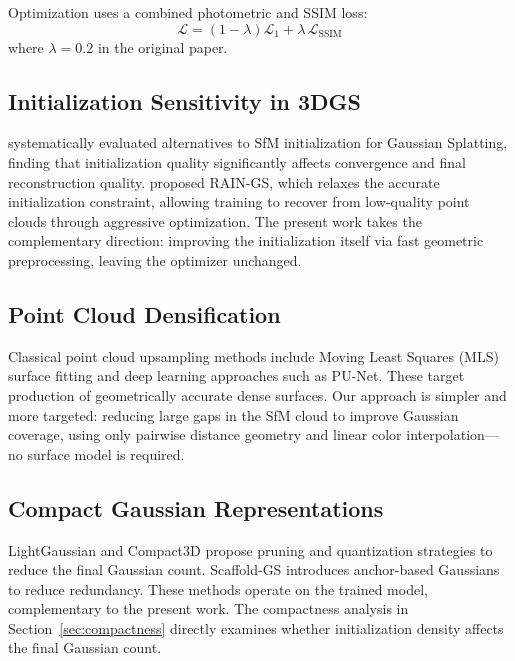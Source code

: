 \documentclass[12pt, a4paper]{article}
\begin{document}
Optimization uses a combined photometric and SSIM loss:
\begin{equation}
    \mathcal{L} = (1 - \lambda)\mathcal{L}_1 + \lambda\,\mathcal{L}_\text{SSIM}
    \label{eq:loss}
\end{equation}
where $\lambda = 0.2$ in the original paper.

\subsection{Initialization Sensitivity in 3DGS}

\citet{foroutan2024sfm} systematically evaluated alternatives to SfM initialization
for Gaussian Splatting, finding that initialization quality significantly affects
convergence and final reconstruction quality. \citet{jung2024rain} proposed RAIN-GS,
which relaxes the accurate initialization constraint, allowing training to recover
from low-quality point clouds through aggressive optimization. The present work
takes the complementary direction: improving the initialization itself via fast
geometric preprocessing, leaving the optimizer unchanged.

\subsection{Point Cloud Densification}

Classical point cloud upsampling methods include Moving Least Squares (MLS)
surface fitting and deep learning approaches such as PU-Net. These target
production of geometrically accurate dense surfaces. Our approach is simpler
and more targeted: reducing large gaps in the SfM cloud to improve Gaussian
coverage, using only pairwise distance geometry and linear color interpolation---
no surface model is required.

\subsection{Compact Gaussian Representations}

LightGaussian \citep{fan2024lightgaussian} and Compact3D \citep{navaneet2023compact3d}
propose pruning and quantization strategies to reduce the final Gaussian count.
Scaffold-GS \citep{lu2024scaffold} introduces anchor-based Gaussians to reduce
redundancy. These methods operate on the trained model, complementary to the
present work. The compactness analysis in Section~\ref{sec:compactness} directly
examines whether initialization density affects the final Gaussian count.
\end{document}

